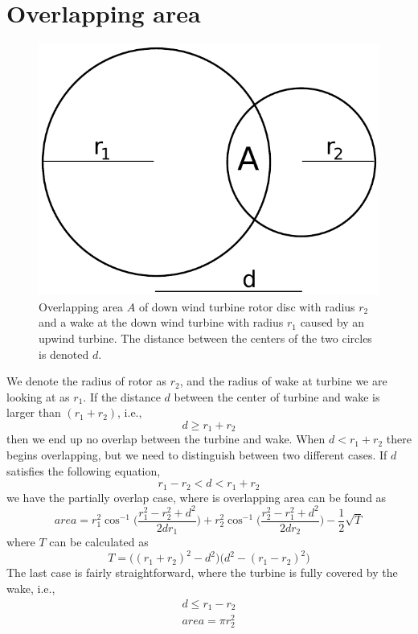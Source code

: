 \documentclass[a4paper, 11pt]{article}
\begin{document}
\section{Overlapping area}
\begin{figure}
\centering
\includegraphics[width=.6\textwidth]{overlapping-area.pdf}
\caption{Overlapping area $A$ of down wind turbine rotor disc with radius $r_2$ and a wake at the down wind turbine with radius $r_1$ caused by an upwind turbine. The distance between the centers of the two circles is denoted $d$.}
\label{fig:overlap}
\end{figure}

We denote the radius of rotor as $r_2$, and the radius of wake at turbine we are looking at as $r_1$. If the distance $d$ between the center of turbine and wake is larger than $(r_1+r_2)$, i.e.,
\begin{equation}
d \geq r_1+r_2
\end{equation}
then we end up no overlap between the turbine and wake. When $d < r_1+r_2$ there begins overlapping, but we need to distinguish between two different cases. If $d$ satisfies the following equation, 
\begin{equation}
r_1-r_2 < d < r_1+r_2
\end{equation}
we have the partially overlap case, where is overlapping area can be found as
\begin{equation}
area = r^2_1 \cos^{-1}\bigg(\frac{r^2_1-r^2_2+d^2}{2dr_1}\bigg)
      +r^2_2 \cos^{-1}\bigg(\frac{r^2_2-r^2_1+d^2}{2dr_2}\bigg)
      -\frac{1}{2}\sqrt{T}
\end{equation}
where $T$ can be calculated as 
\begin{equation}
T = \Big((r_1+r_2)^2-d^2\Big)\Big(d^2-(r_1-r_2)^2 \Big)
\end{equation}
The last case is fairly straightforward, where the turbine is fully covered by the wake, i.e.,
\begin{equation}
	\begin{aligned}
	d \leq r_1-r_2 \\
	area = \pi r^2_2
	\end{aligned}
\end{equation}
\end{document}
